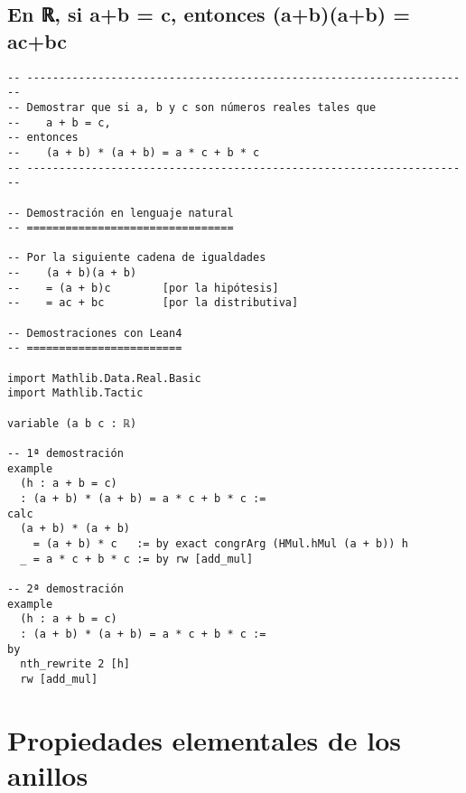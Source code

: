 \section{En ℝ, si a+b = c, entonces (a+b)(a+b) = ac+bc}
\label{sec:org88d36f1}
\begin{verbatim}
-- ---------------------------------------------------------------------
-- Demostrar que si a, b y c son números reales tales que
--    a + b = c,
-- entonces
--    (a + b) * (a + b) = a * c + b * c
-- ---------------------------------------------------------------------

-- Demostración en lenguaje natural
-- ================================

-- Por la siguiente cadena de igualdades
--    (a + b)(a + b)
--    = (a + b)c        [por la hipótesis]
--    = ac + bc         [por la distributiva]

-- Demostraciones con Lean4
-- ========================

import Mathlib.Data.Real.Basic
import Mathlib.Tactic

variable (a b c : ℝ)

-- 1ª demostración
example
  (h : a + b = c)
  : (a + b) * (a + b) = a * c + b * c :=
calc
  (a + b) * (a + b)
    = (a + b) * c   := by exact congrArg (HMul.hMul (a + b)) h
  _ = a * c + b * c := by rw [add_mul]

-- 2ª demostración
example
  (h : a + b = c)
  : (a + b) * (a + b) = a * c + b * c :=
by
  nth_rewrite 2 [h]
  rw [add_mul]
\end{verbatim}

\chapter{Propiedades elementales de los anillos}
\label{sec:org711217f}

